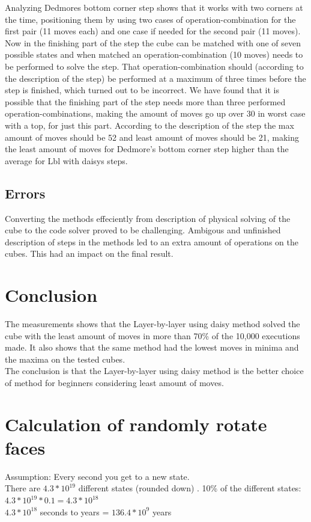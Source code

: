 \documentclass[a4paper,11pt]{kth-mag}
\begin{document}
Analyzing Dedmores bottom corner step shows that it works with two corners at the time, positioning them by using two cases of operation-combination for the first pair (11 moves each) and one case if needed for the second pair (11 moves). Now in the finishing part of the step the cube can be matched with one of seven possible states and when matched an operation-combination (10 moves) needs to be performed to solve the step. That operation-combination should (according to the description of the step) be performed at a maximum of three times before the step is finished, which turned out to be incorrect. We have found that it is possible that the finishing part of the step needs more than three performed operation-combinations, making the amount of moves go up over 30 in worst case with a top, for just this part. According to the description of the step the max amount of moves should be 52 and least amount of moves should be 21, making the least amount of moves for Dedmore's bottom corner step higher than the average for Lbl with daisys steps.       


\section{Errors}
Converting the methods effeciently from description of physical solving of the cube to the code solver proved to be challenging. Ambigous and unfinished description of steps in the methods led to an extra amount of operations on the cubes. This had an impact on the final result.

\chapter{Conclusion}
The measurements shows that the Layer-by-layer using daisy method solved the cube with the least amount of moves in more than 70\% of the 10,000 executions made. It also shows that the same method had the lowest moves in minima and the maxima on the tested cubes.\\ The conclusion is that the Layer-by-layer using daisy method is the better choice of method for beginners considering least amount of moves. 


\renewcommand{\bibname}{References}



\appendix
\addappheadtotoc
\chapter{Calculation of randomly rotate faces}\label{appA}
Assumption: Every second you get to a new state.\\
There are $4.3*10^{19}$  different states (rounded down) \cite{Faculty}.
10\% of the different states:\\
$4.3*10^{19}*0.1=4.3*10^{18}$ \\
$4.3*10^{18}$ seconds to years = $136.4*10^{9}$ years
\cite{Wolfram}
\end{document}
